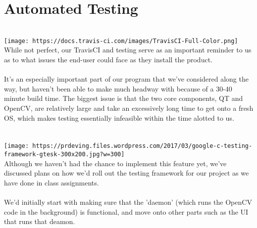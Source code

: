 \documentclass[12pt]{article}
\begin{document}
\section*{Automated Testing}
\\\texttt{[image: https://docs.travis-ci.com/images/TravisCI-Full-Color.png]}
\\
While not perfect, our TravisCI and testing serve as an important reminder to us as to what issues the end-user could face as they install the product. 
\\
\\It's an especially important part of our program that we've considered along the way, but haven't been able to make much headway with because of a 30-40 minute build time. The biggest issue is that the two core components, QT and OpenCV, are relatively large and take an excessively long time to get onto a fresh OS, which makes testing essentially infeasible within the time alotted to us.
\\
\\
\\\texttt{[image: https://prdeving.files.wordpress.com/2017/03/google-c-testing-framework-gtesk-300x200.jpg?w=300]}
\\Although we haven't had the chance to implement this feature yet, we've discussed plans on how we'd roll out the testing framework for our project as we have done in class assignments. 
\\
\\We'd initially start with making sure that the 'daemon' (which runs the OpenCV code in the background) is functional, and move onto other parts such as the UI that runs that deamon.
\pagebreak
\end{document}
